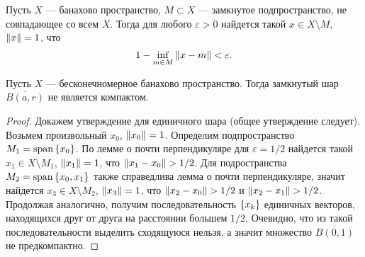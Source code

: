 \begin{lemma}
    Пусть $X$ --- банахово пространство, $M \subset X$ --- замкнутое подпространство,
    не совпадающее со всем $X$. Тогда
    для любого $\varepsilon > 0$ найдется такой $x \in X \setminus M$, $\left\|x\right\| = 1$, что
    \[ 1 - \inf_{m\in M} \left\|x - m\right\| < \varepsilon. \]
\end{lemma}

\begin{theorem}
    Пусть $X$ --- бесконечномерное банахово пространство. Тогда замкнутый шар 
    $\overline{B(a, r)}$ не является компактом.
\end{theorem}

\begin{proof}
    Докажем утверждение для единичного шара (общее утверждение следует). Возьмем произвольный
    $x_0$, $\left\|x_0\right\| = 1$. Определим подпространство $M_1 = \operatorname{span}\left\{x_0\right\}$. 
    По лемме о почти перпендикуляре для $\varepsilon = 1/2$ найдется такой 
    $x_1 \in X \setminus M_1$, $\left\|x_1\right\| = 1$, что
    $\left\|x_1 - x_0\right\| > 1/2$. Для подространства $M_2 = \operatorname{span}\left\{x_0, x_1\right\}$ также 
    справедлива лемма о почти перпендикуляре, значит найдется $x_3 \in X \setminus M_2$, 
    $\left\|x_3\right\| = 1$, что $\left\|x_2 - x_0\right\| > 1/2$ и $\left\|x_2 - x_1\right\| > 1/2$. Продолжая аналогично, получим
    последовательность $\left\{x_k\right\}$ единичных векторов, находящихся друг от друга на расстоянии 
    большем $1/2$.
    Очевидно, что из такой последовательности выделить сходящуюся нельзя, а значит множество 
    $\overline{B(0, 1)}$ не предкомпактно.
\end{proof}
